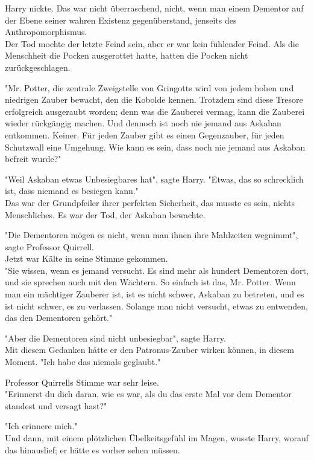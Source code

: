 {Harry nickte. Das war nicht überraschend, nicht, wenn man einem Dementor auf der Ebene seiner wahren Existenz gegenüberstand, jenseits des Anthropomorphismus.\\ Der Tod mochte der letzte Feind sein, aber er war kein fühlender Feind. Als die Menschheit die Pocken ausgerottet hatte, hatten die Pocken nicht zurückgeschlagen.

"Mr. Potter, die zentrale Zweigstelle von Gringotts wird von jedem hohen und niedrigen Zauber bewacht, den die Kobolde kennen. Trotzdem sind diese Tresore erfolgreich ausgeraubt worden; denn was die Zauberei vermag, kann die Zauberei wieder rückgängig machen. Und dennoch ist noch nie jemand aus Askaban entkommen. Keiner. Für jeden Zauber gibt es einen Gegenzauber, für jeden Schutzwall eine Umgehung. Wie kann es sein, dass noch nie jemand aus Askaban befreit wurde?"

"Weil Askaban etwas Unbesiegbares hat", sagte Harry. "Etwas, das so schrecklich ist, dass niemand es besiegen kann."\\ Das war der Grundpfeiler ihrer perfekten Sicherheit, das musste es sein, nichts Menschliches. Es war der Tod, der Askaban bewachte.

"Die Dementoren mögen es nicht, wenn man ihnen ihre Mahlzeiten wegnimmt", sagte Professor Quirrell.\\ Jetzt war Kälte in seine Stimme gekommen.\\ "Sie wissen, wenn es jemand versucht. Es sind mehr als hundert Dementoren dort, und sie sprechen auch mit den Wächtern. So einfach ist das, Mr. Potter. Wenn man ein mächtiger Zauberer ist, ist es nicht schwer, Askaban zu betreten, und es ist nicht schwer, es zu verlassen. Solange man nicht versucht, etwas zu entwenden, das den Dementoren gehört."

"Aber die Dementoren sind nicht unbesiegbar", sagte Harry.\\ Mit diesem Gedanken hätte er den Patronus-Zauber wirken können, in diesem Moment. "Ich habe das niemals geglaubt."

Professor Quirrells Stimme war sehr leise.\\ "Erinnerst du dich daran, wie es war, als du das erste Mal vor dem Dementor standest und versagt hast?"

"Ich erinnere mich."\\ Und dann, mit einem plötzlichen Übelkeitsgefühl im Magen, wusste Harry, worauf das hinauslief; er hätte es vorher sehen müssen.

}
